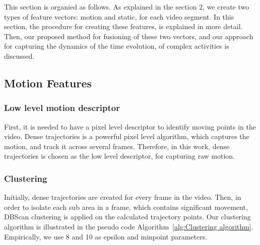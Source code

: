 
This section is organied as follows. As explained in the section 2, we create two types of feature vectors: motion and static, for each video segment. In this section,
the procedure for creating these features, is explained in more detail. Then, our proposed method for fusioning of these two vectors,
and our approach for capturing the dynamics of the time evolution, of complex activities is discussed. 

\subsection{Motion Features}
\subsubsection{Low level motion descriptor}
First, it is needed to have a pixel level descriptor to identify moving points in the video. Dense trajectories is a powerful
pixel level algorithm, which captures the motion, and track it across several frames. Therefore, in this work, 
dense trajectories is chosen as the low level descriptor, for capturing raw motion.

\subsubsection{Clustering}

Initially, dense trajectories are created for every frame in the video.
Then, in order to isolate each sub area in a frame, which contains significant movement, DBScan clustering is applied on the 
calculated trajectory points.
Our clustering algorithm is illustrated in the pseudo code Algorithm~\ref{alg:Clustering algorithm}. Empirically, we use 8 and 10 as epsilon and minpoint parameters.



